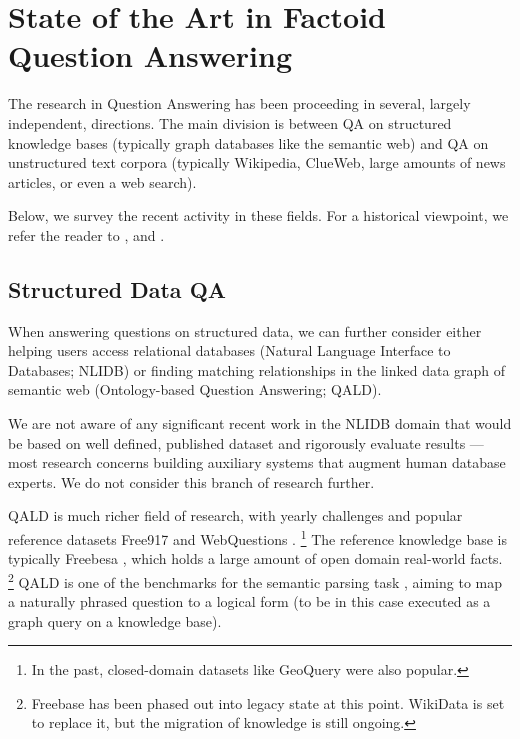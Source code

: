 \chapter{State of the Art in Factoid Question Answering}
\label{ch:survey}

The research in Question Answering has been proceeding in several,
largely independent, directions.  The main division is between QA
on structured knowledge bases (typically graph databases like the
semantic web) and QA on unstructured text corpora (typically
Wikipedia, ClueWeb, large amounts of news articles, or even
a web search).

Below, we survey the recent activity in these fields.
For a historical viewpoint, we refer the reader to
\cite{SurveyWang}, \cite{SurveyAllam} and \cite{SurveyLopeza}.


\section{Structured Data QA}
\label{sec:structured}

When answering questions on structured data, we can further
consider either helping users access relational databases (Natural Language Interface to Databases; NLIDB)
or finding matching relationships in the linked data graph of semantic web (Ontology-based Question Answering; QALD).

We are not aware of any significant recent work in the NLIDB domain
that would be based on well defined, published dataset and rigorously
evaluate results --- most research concerns building auxiliary systems
that augment human database experts. \citep{BergamaschiKeymantic, BlunschiSODA}
We do not consider this branch of research further.

QALD is much richer field of research, with yearly challenges \citep{QALD} and
popular reference datasets Free917 \citep{Free917} and WebQuestions \citep{WebQuestions}.%
\footnote{In the past, closed-domain datasets like GeoQuery were also popular.}
The reference knowledge base is typically Freebesa \citep{Freebase},
which holds a large amount of open domain real-world facts.%
\footnote{Freebase has been phased out into legacy state at this point.
	WikiData is set to replace it, but the migration of knowledge
	is still ongoing.}
QALD is one of the benchmarks for the semantic parsing task \citep{SPIntro}, aiming
to map a naturally phrased question to a logical form (to be in this case
executed as a graph query on a knowledge base).
\citep{SPBerant2014Paraphrase, Semantic2014Bordes}


